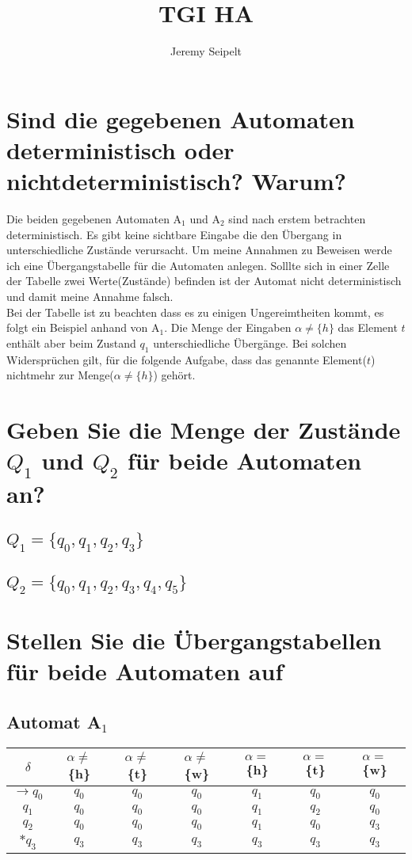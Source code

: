 \documentclass[11pt]{article} %
\title{TGI HA}
\author{Jeremy Seipelt}
\begin{document}
\maketitle

\section{Sind die gegebenen Automaten deterministisch oder nichtdeterministisch? Warum?}

Die beiden gegebenen Automaten A$_{1}$ und A$_{2}$ sind nach erstem betrachten deterministisch.
Es gibt keine sichtbare Eingabe die den Übergang in unterschiedliche Zustände verursacht.
Um meine Annahmen zu Beweisen werde ich eine Übergangstabelle für die Automaten anlegen.
Solllte sich in einer Zelle der Tabelle zwei Werte(Zustände) befinden ist der Automat nicht deterministisch und damit meine Annahme falsch.\\
Bei der Tabelle ist zu beachten dass es zu einigen Ungereimtheiten kommt, es folgt ein Beispiel anhand von A$_{1}$.
Die Menge der Eingaben $\alpha \neq \{h\}$ das Element $t$ enthält aber beim Zustand  $q_{1}$ unterschiedliche Übergänge. 
Bei solchen Widersprüchen gilt, für die folgende Aufgabe, dass das genannte Element($t$) nichtmehr zur Menge($\alpha \neq \{h\}$) gehört.
\section{Geben Sie die Menge der Zustände $Q_{1}$ und $Q_{2}$ für beide Automaten an?}
\subsection{$Q_{1}=\{q_{0},q_{1},q_{2},q_{3}\}$}
\subsection{$Q_{2}=\{q_{0},q_{1},q_{2},q_{3},q_{4},q_{5}\}$}
\section{Stellen Sie die Übergangstabellen für beide Automaten auf }
\subsection{Automat A$_{1}$}
\begin{tabular}{c|c|c|c|c|c|c}
 $\delta$ & $\alpha \neq $\{h\}&  $\alpha \neq $\{t\}  &  $\alpha \neq $\{w\} & $\alpha = $\{h\}&  $\alpha = $\{t\}  &  $\alpha = $\{w\}\\
 \hline
 $\rightarrow q_{0}$ & $q_{0}$  & $q_{0}$ & $q_{0}$ & $q_{1}$ & $q_{0}$ & $q_{0}$ \\
 \hline
 $q_{1}$ & $q_{0}$  &  $q_{0}$ &  $q_{0}$ &  $q_{1}$ &  $q_{2}$ &  $q_{0}$ \\
 \hline
 $q_{2}$ &  $q_{0}$  &  $q_{0}$ &  $q_{0}$ &  $q_{1}$ &  $q_{0}$ &  $q_{3}$ \\
\hline
 $\ast q_{3}$ &  $q_{3}$  &  $q_{3}$ &  $q_{3}$ &  $q_{3}$ &  $q_{3}$ &  $q_{3}$ \\
 \hline
 \end{tabular}\\
\end{document}
